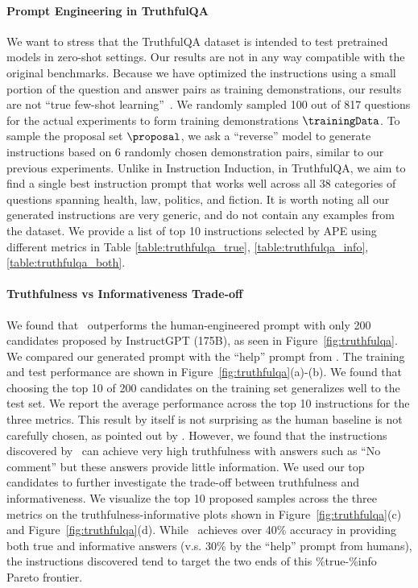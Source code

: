 \paragraph{Prompt Engineering in TruthfulQA} We want to stress that the TruthfulQA dataset is intended to test pretrained models in zero-shot settings. Our results are not in any way compatible with the original benchmarks. Because we have optimized the instructions using a small portion of the question and answer pairs as training demonstrations, our results are not ``true few-shot learning''~\citep{perez2021true}. We randomly sampled 100 out of 817 questions for the actual experiments to form training demonstrations $\trainingData$. To sample the proposal set $\proposal$, we ask a ``reverse'' model to generate instructions based on 6 randomly chosen demonstration pairs, similar to our previous experiments. Unlike in Instruction Induction, in TruthfulQA, we aim to find a single best instruction prompt that works well across all 38 categories of questions spanning health, law, politics, and fiction. It is worth noting all our generated instructions are very generic, 
and do not contain any examples from the dataset. We provide a list of top 10 instructions selected by APE using different metrics in Table \ref{table:truthfulqa_true}, \ref{table:truthfulqa_info}, \ref{table:truthfulqa_both}.

\paragraph{Truthfulness vs Informativeness Trade-off}
We found that \algname~outperforms the human-engineered prompt with only 200 candidates proposed by InstructGPT (175B), as seen in Figure~\ref{fig:truthfulqa}. We compared our generated prompt with the ``help'' prompt from \citet{lin2022truthfulqa}.
The training and test performance are shown in Figure~\ref{fig:truthfulqa}(a)-(b). We found that choosing the top 10 of 200 candidates on the training set generalizes well to the test set. We report the average performance across the top 10 instructions for the three metrics.
This result by itself is not surprising as the human baseline is not carefully chosen, as pointed out by \citet{askell2021general}. However, we found that the instructions discovered by \algname~can achieve very high truthfulness with answers such as ``No comment'' but these answers provide little information. We used our top candidates to further investigate the trade-off between truthfulness and informativeness. We visualize the top 10 proposed samples across the three metrics on the truthfulness-informative plots shown in Figure~\ref{fig:truthfulqa}(c) and Figure~\ref{fig:truthfulqa}(d). While \algname~achieves over 40\% accuracy in providing both true and informative answers (v.s. 30\% by the ``help'' prompt from humans), the instructions discovered tend to target the two ends of this \%true-\%info Pareto frontier. 

